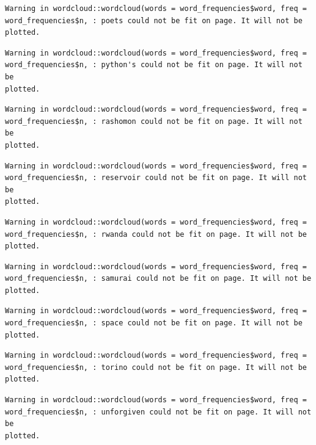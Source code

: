\documentclass[
  letterpaper,
]{krantz}
\begin{document}
\begin{verbatim}
Warning in wordcloud::wordcloud(words = word_frequencies$word, freq =
word_frequencies$n, : poets could not be fit on page. It will not be plotted.
\end{verbatim}

\begin{verbatim}
Warning in wordcloud::wordcloud(words = word_frequencies$word, freq =
word_frequencies$n, : python's could not be fit on page. It will not be
plotted.
\end{verbatim}

\begin{verbatim}
Warning in wordcloud::wordcloud(words = word_frequencies$word, freq =
word_frequencies$n, : rashomon could not be fit on page. It will not be
plotted.
\end{verbatim}

\begin{verbatim}
Warning in wordcloud::wordcloud(words = word_frequencies$word, freq =
word_frequencies$n, : reservoir could not be fit on page. It will not be
plotted.
\end{verbatim}

\begin{verbatim}
Warning in wordcloud::wordcloud(words = word_frequencies$word, freq =
word_frequencies$n, : rwanda could not be fit on page. It will not be plotted.
\end{verbatim}

\begin{verbatim}
Warning in wordcloud::wordcloud(words = word_frequencies$word, freq =
word_frequencies$n, : samurai could not be fit on page. It will not be plotted.
\end{verbatim}

\begin{verbatim}
Warning in wordcloud::wordcloud(words = word_frequencies$word, freq =
word_frequencies$n, : space could not be fit on page. It will not be plotted.
\end{verbatim}

\begin{verbatim}
Warning in wordcloud::wordcloud(words = word_frequencies$word, freq =
word_frequencies$n, : torino could not be fit on page. It will not be plotted.
\end{verbatim}

\begin{verbatim}
Warning in wordcloud::wordcloud(words = word_frequencies$word, freq =
word_frequencies$n, : unforgiven could not be fit on page. It will not be
plotted.
\end{verbatim}
\end{document}
